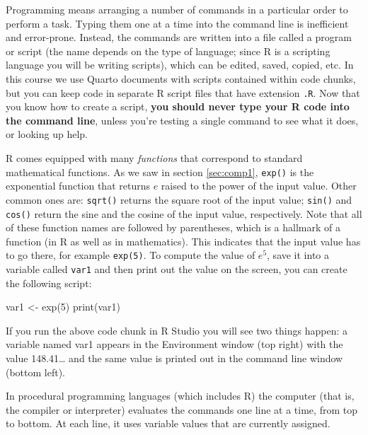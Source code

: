 \documentclass[
  letterpaper,
  DIV=11,
  numbers=noendperiod]{scrreprt}
\newenvironment{Shaded}{\begin{snugshade}}{\end{snugshade}}
\newcommand{\NormalTok}[1]{\textcolor[rgb]{0.00,0.23,0.31}{#1}}
\begin{document}
Programming means arranging a number of commands in a particular order
to perform a task. Typing them one at a time into the command line is
inefficient and error-prone. Instead, the commands are written into a
file called a program or script (the name depends on the type of
language; since R is a scripting language you will be writing scripts),
which can be edited, saved, copied, etc. In this course we use Quarto
documents with scripts contained within code chunks, but you can keep
code in separate R script files that have extension \texttt{.R}. Now
that you know how to create a script, \textbf{you should never type your
R code into the command line}, unless you're testing a single command to
see what it does, or looking up help.

R comes equipped with many \emph{functions} that correspond to standard
mathematical functions. As we saw in section \ref{sec:comp1},
\texttt{exp()} is the exponential function that returns \(e\) raised to
the power of the input value. Other common ones are: \texttt{sqrt()}
returns the square root of the input value; \texttt{sin()} and
\texttt{cos()} return the sine and the cosine of the input value,
respectively. Note that all of these function names are followed by
parentheses, which is a hallmark of a function (in R as well as in
mathematics). This indicates that the input value has to go there, for
example \texttt{exp(5)}. To compute the value of \(e^5\), save it into a
variable called \texttt{var1} and then print out the value on the
screen, you can create the following script:

\begin{Shaded}
\begin{Highlighting}[]
\NormalTok{var1 \textless{}{-} exp(5)}
\NormalTok{print(var1)}
\end{Highlighting}
\end{Shaded}

If you run the above code chunk in R Studio you will see two things
happen: a variable named var1 appears in the Environment window (top
right) with the value 148.41\ldots{} and the same value is printed out
in the command line window (bottom left).

\begin{tcolorbox}[enhanced jigsaw, arc=.35mm, colframe=quarto-callout-tip-color-frame, left=2mm, opacitybacktitle=0.6, breakable, title=\textcolor{quarto-callout-tip-color}{\faLightbulb}\hspace{0.5em}{programming principle}, toprule=.15mm, coltitle=black, bottomtitle=1mm, toptitle=1mm, colback=white, leftrule=.75mm, colbacktitle=quarto-callout-tip-color!10!white, titlerule=0mm, opacityback=0, rightrule=.15mm, bottomrule=.15mm]

In procedural programming languages (which includes R) the computer
(that is, the compiler or interpreter) evaluates the commands one line
at a time, from top to bottom. At each line, it uses variable values
that are currently assigned.

\end{tcolorbox}
\end{document}
